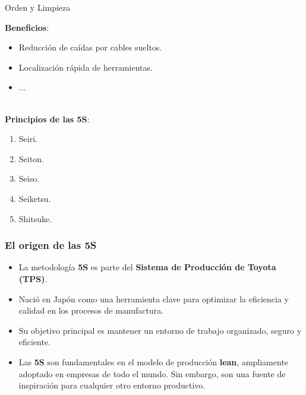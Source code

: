 \documentclass{beamer}
\begin{document}
\begin{frame}{Orden y Limpieza}

\hspace{1cm}\textbf{Beneficios}:
        \begin{itemize}
            \item Reducción de caídas por cables sueltos.
            \item Localización rápida de herramientas.
            \item ...
        \end{itemize}
    \\\vspace{1cm}
    \hspace{1cm}\textbf{Principios de las 5S}:
        \begin{enumerate}
            \item Seiri.
            \item Seiton.
            \item Seiso.
            \item Seiketsu.
            \item Shitsuke.
        \end{enumerate}
\end{frame}

\begin{frame}
\frametitle{El origen de las 5S}
\begin{itemize}
    \item La metodología \textbf{5S} es parte del \textbf{Sistema de Producción de Toyota (TPS)}.
    \item Nació en Japón como una herramienta clave para optimizar la eficiencia y calidad en los procesos de manufactura.
    \item Su objetivo principal es mantener un entorno de trabajo organizado, seguro y eficiente.
    \item Las \textbf{5S} son fundamentales en el modelo de producción \textbf{lean}, ampliamente adoptado en empresas de todo el mundo. Sin embargo, son una fuente de inspiración para cualquier otro entorno productivo.
\end{itemize}

\end{frame}
\end{document}
